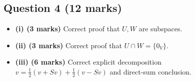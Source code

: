 \documentclass[12pt]{article}
\begin{document}
\subsection{Question 4 \hfill (12 marks)}
\begin{itemize}[leftmargin=1.6em]
\item \textbf{(i) (3 marks)} Correct proof that \(U,W\) are subspaces.
\item \textbf{(ii) (3 marks)} Correct proof that \(U\cap W=\{0_V\}\).
\item \textbf{(iii) (6 marks)} Correct explicit decomposition \(v=\frac12(v+Sv)+\frac12(v-Sv)\) and direct-sum conclusion.
\end{itemize}
\end{document}
